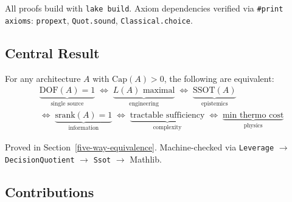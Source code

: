 All proofs build with \texttt{lake build}. Axiom dependencies verified via \texttt{\#print axioms}: \texttt{propext}, \texttt{Quot.sound}, \texttt{Classical.choice}.

\subsection{Central Result}

\begin{theorem}\label{thm:five-way}
For any architecture $A$ with $\mathrm{Cap}(A) > 0$, the following are equivalent:
\[
\begin{aligned}
&\underbrace{\mathrm{DOF}(A) = 1}_{\text{single source}}
\;\iff\;
\underbrace{L(A) \text{ maximal}}_{\text{engineering}}
\;\iff\;
\underbrace{\mathrm{SSOT}(A)}_{\text{epistemics}} \\
&\iff\;
\underbrace{\mathrm{srank}(A) = 1}_{\text{information}}
\;\iff\;
\underbrace{\text{tractable sufficiency}}_{\text{complexity}}
\;\iff\;
\underbrace{\text{min thermo cost}}_{\text{physics}}
\end{aligned}
\]
\end{theorem}

Proved in Section~\ref{five-way-equivalence}. Machine-checked via \texttt{Leverage} $\to$ \texttt{DecisionQuotient} $\to$ \texttt{Ssot} $\to$ Mathlib.

\subsection{Contributions}

